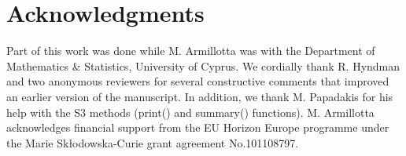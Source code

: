 \section{Acknowledgments}
Part of this work was done while M. Armillotta was with the Department of Mathematics \& Statistics, University of Cyprus.
We cordially thank R. Hyndman and two anonymous reviewers for several constructive comments that improved an earlier version 
of the manuscript. In addition, we thank M. Papadakis for his help with the S3 methods (print() and summary() functions).
M. Armillotta acknowledges financial support from the EU Horizon Europe programme under the Marie Skłodowska-Curie grant agreement No.101108797.


